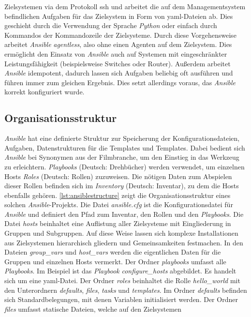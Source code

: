 \documentclass[titlepage]{report}
\begin{document}
Zielsystemen via dem Protokoll \gls{ssh} und arbeitet die auf dem
Managementsystem befindlichen Aufgaben für das Zielsystem in Form von
\gls{yaml}\hyp{}Dateien ab. Dies geschieht durch
die Verwendung der Sprache \emph{Python} oder einfach durch Kommandos 
der Kommandozeile der Zielsysteme. Durch
diese Vorgehensweise arbeitet \emph{Ansible} \emph{agentless}, also ohne
einen Agenten auf dem Zielsystem. Dies
ermöglicht den Einsatz von \emph{Ansible} auch auf Systemen mit
eingeschränkter Leistungsfähigkeit (beispielsweise Switches oder Router).
Außerdem arbeitet \emph{Ansible} idempotent, dadurch lassen sich
Aufgaben beliebig oft ausführen und führen immer zum gleichen Ergebnis.
Dies setzt allerdings voraus, das \emph{Ansible} korrekt konfiguriert
wurde.
\subsection{Organisationsstruktur}
\emph{Ansible} hat eine definierte Struktur zur Speicherung der
Konfigurationsdateien, Aufgaben, Datenstrukturen für die Templates und
Templates. Dabei bedient sich \emph{Ansible} bei Synonymen aus der
Filmbranche, um den Einstieg in das Werkzeug zu erleichtern.
\emph{Playbooks} (Deutsch: Drehbücher) werden verwendet, um einzelnen
Hosts \emph{Roles} (Deutsch: Rollen) zuzuweisen. Die nötigen Daten zum
Abspielen dieser Rollen befinden sich im \emph{Inventory} (Deutsch:
Inventar), zu dem die Hosts ebenfalls gehören. 
\autoref{lst:ansiblestructure} zeigt die Organisationsstruktur eines
solchen \emph{Ansible}\hyp{}Projekts. Die Datei \emph{ansible.cfg} ist die
Konfigurationsdatei für \emph{Ansible} und definiert den Pfad zum
Inventar, den Rollen und den \emph{Playbooks}. Die Datei \emph{hosts}
beinhaltet eine Auflistung aller Zielsysteme mit Eingliederung in
Gruppen und Subgruppen. Auf diese Weise lassen sich komplexe
Installationen aus Zielsystemen hierarchisch gliedern und
Gemeinsamkeiten festmachen. In den Dateien \emph{group\_vars} und
\emph{host\_vars} werden die eigentlichen Daten für die Gruppen und
einzelnen Hosts vermerkt. Der Ordner \emph{playbooks} umfasst alle
\emph{Playbooks}. Im Beispiel ist das \emph{Playbook}
\emph{configure\_hosts} abgebildet. Es handelt sich um eine \gls{yaml}\hyp{}Datei.
Der Ordner \emph{roles} beinhaltet die Rolle \emph{hello\_world} mit den
Unterordnern \emph{defaults}, \emph{files}, \emph{tasks} und
\emph{templates}. Im Ordner \emph{defaults} befinden sich
Standardbelegungen, mit denen Variablen initialisiert werden. Der Ordner
\emph{files} umfasst statische Dateien, welche auf den Zielsystemen
\end{document}
